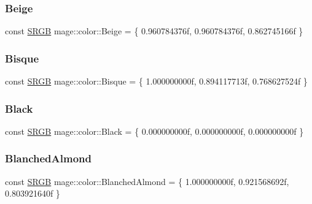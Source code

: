 \subsubsection{\texorpdfstring{Beige}{Beige}}
{\footnotesize\ttfamily const \hyperlink{structmage_1_1_s_r_g_b}{S\+R\+GB} mage\+::color\+::\+Beige = \{ 0.\+960784376f, 0.\+960784376f, 0.\+862745166f \}}

\hypertarget{namespacemage_1_1color_a7c22f62280a9efea3170feea8c99b19f}{}\label{namespacemage_1_1color_a7c22f62280a9efea3170feea8c99b19f} 
\subsubsection{\texorpdfstring{Bisque}{Bisque}}
{\footnotesize\ttfamily const \hyperlink{structmage_1_1_s_r_g_b}{S\+R\+GB} mage\+::color\+::\+Bisque = \{ 1.\+000000000f, 0.\+894117713f, 0.\+768627524f \}}

\hypertarget{namespacemage_1_1color_ac95e41f0ea0c7c9325356ec5527f789b}{}\label{namespacemage_1_1color_ac95e41f0ea0c7c9325356ec5527f789b} 
\subsubsection{\texorpdfstring{Black}{Black}}
{\footnotesize\ttfamily const \hyperlink{structmage_1_1_s_r_g_b}{S\+R\+GB} mage\+::color\+::\+Black = \{ 0.\+000000000f, 0.\+000000000f, 0.\+000000000f \}}

\hypertarget{namespacemage_1_1color_a23e575bdc273602ef9b6a0bee3da6650}{}\label{namespacemage_1_1color_a23e575bdc273602ef9b6a0bee3da6650} 
\subsubsection{\texorpdfstring{Blanched\+Almond}{BlanchedAlmond}}
{\footnotesize\ttfamily const \hyperlink{structmage_1_1_s_r_g_b}{S\+R\+GB} mage\+::color\+::\+Blanched\+Almond = \{ 1.\+000000000f, 0.\+921568692f, 0.\+803921640f \}}

\hypertarget{namespacemage_1_1color_acde82252eac22aeaf6c468955610a98a}{}\label{namespacemage_1_1color_acde82252eac22aeaf6c468955610a98a} 
